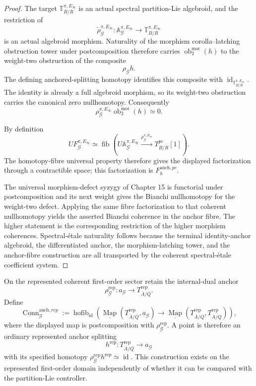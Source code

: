 \begin{proof}
The target
$\mathbb T_{B/R}^{\pi,E_\infty}$ is an actual spectral partition-Lie algebroid, and
the restriction of
\[
\widetilde\rho_{\mathcal G}^{\pi,E_\infty}:
\mathbb A_{\mathcal G}^{\pi,E_\infty}
\longrightarrow
\mathbb T_{B/R}^{\pi,E_\infty}
\]
is an actual algebroid morphism.  Naturality of the morphism corolla--latching
obstruction tower under postcomposition therefore carries
$\operatorname{ob}^{\mathrm{mor}}_2(h)$ to the weight-two obstruction of the
composite
\[
\rho_{\mathcal G}h.
\]
The defining anchored-splitting homotopy identifies this composite with
$\operatorname{id}_{\mathbb T_{B/R}^{\pi,E_\infty}}$.  The identity is already a
full algebroid morphism, so its weight-two obstruction carries the canonical zero
nullhomotopy.  Consequently
\[
\rho_{\mathcal G}^{\pi,E_\infty}
\operatorname{ob}^{\mathrm{mor}}_2(h)
\simeq0.
\]

By definition
\[
UF_{\mathcal G}^{\pi,E_\infty}
\simeq
\operatorname{fib}
\left(
U\mathbb A_{\mathcal G}^{\pi,E_\infty}
\xrightarrow{\rho_{\mathcal G}^{\pi,E_\infty}}
T_{B/R}^{pc}[1]
\right).
\]
The homotopy-fibre universal property therefore gives the displayed factorization
through a contractible space; this factorization is
$F_h^{\mathrm{anch},pc}$.

The universal morphism-defect syzygy of Chapter 15 is functorial under
postcomposition and its next weight gives the Bianchi nullhomotopy for the
weight-two defect.  Applying the same fibre factorization to that coherent
nullhomotopy yields the asserted Bianchi coherence in the anchor fibre.  The
higher statement is the corresponding restriction of the higher morphism
coherences.  Spectral-\'etale naturality follows because the terminal
identity-anchor algebroid, the differentiated anchor, the morphism-latching tower,
and the anchor-fibre construction are all transported by the coherent
spectral-\'etale coefficient system.
\end{proof}

\begin{construction}
\label{constr:symmetry-noether-represented-anchor-splitting-realization}
On the represented coherent first-order sector retain the internal-dual anchor
\[
\rho_{\mathcal G}^{\mathrm{rep}}:
a_{\mathcal G}
\longrightarrow
T_{\overline A/Q}^{\mathrm{rep}}.
\]
Define
\[
\boxed{
\operatorname{Conn}^{\mathrm{anch},rep}_{\mathcal G}
:=
\operatorname{hofib}_{\operatorname{id}}
\left(
\underline{\operatorname{Map}}
\left(T_{\overline A/Q}^{\mathrm{rep}},a_{\mathcal G}\right)
\longrightarrow
\underline{\operatorname{Map}}
\left(T_{\overline A/Q}^{\mathrm{rep}},T_{\overline A/Q}^{\mathrm{rep}}\right)
\right),
}
\]
where the displayed map is postcomposition with
$\rho_{\mathcal G}^{\mathrm{rep}}$.  A point is therefore an ordinary represented
anchor splitting
\[
h^{\mathrm{rep}}:
T_{\overline A/Q}^{\mathrm{rep}}
\longrightarrow
a_{\mathcal G}
\]
with its specified homotopy
$\rho_{\mathcal G}^{\mathrm{rep}}h^{\mathrm{rep}}\simeq\operatorname{id}$.
This construction exists on the represented first-order domain independently of
whether it can be compared with the partition-Lie controller.
\end{construction}

